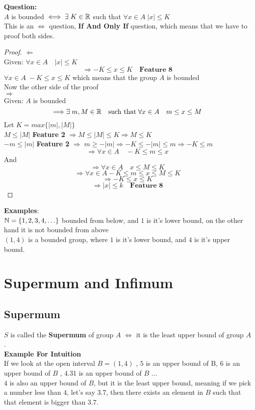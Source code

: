 \noindent \textbf{Question:}\\
$A$ is bounded $\iff \exists \; K\in \mathbb{R}$ such that $\forall x\in A \; |x|\leq K$\\
This is an $\iff$ question, \textbf{If And Only If} question, which means that we have to proof both sides.
\begin{proof}
    
    $\Longleftarrow$\\
    Given: $\forall x\in A \quad|x|\leq K$\\
    \[
        \Longrightarrow -K\leq x\leq K \quad\textbf{Feature 8}
    \]
    $\forall x\in A \; -K\leq x\leq K$ which means that the group $A$ is bounded\\
    Now the other side of the proof\\
    $\Longrightarrow$\\
    Given: $A$ is bounded\\
    \[
        \Longrightarrow \exists \; m,M \in \mathbb{R} \quad\text{such that}\; \forall x\in A \quad m\leq x\leq M
    \]
    Let $K = max\{|m|,|M|\}$\\
    $M \leq |M|$ \textbf{Feature 2} $\Longrightarrow M\leq |M|\leq K \Longrightarrow M\leq K$\\
    $-m \leq |m|$ \textbf{Feature 2} $\Longrightarrow \; m\geq -|m| \Longrightarrow -K\leq -|m| \leq m\Longrightarrow -K\leq m$\\
    \[
        \Longrightarrow \forall x\in A \quad -K\leq m\leq x
    \]
    And\\
    \[
        \Longrightarrow \forall x\in A \quad x\leq M\leq K
    \]
    \[
        \Longrightarrow \forall x\in A -K\leq m\leq x\leq M\leq K
    \]
    \[
        \Longrightarrow -K\leq x\leq K
    \]
    \[
        \Longrightarrow |x|\leq k \quad \textbf{Feature 8}
    \]
\end{proof}
\noindent \textbf{Examples}\;:\\
$\mathbb{N} = \{1,2,3,4,\ldots\}$ bounded from below, and $1$ is it's lower bound, on the other hand it is not bounded from above\\
$(1,4)$ is a bounded group, where $1$ is it's lower bound, and $4$ is it's upper bound.\\


\section{Supermum and Infimum}
\subsection{Supermum}
$S$ is called the \textbf{Supermum} of group $A$ $\iff$ it is the least upper bound of group $A$.\\
\textbf{Example For Intuition}\\
If we look at the open interval $B= (1,4)$ , $5$ is an upper bound of B, $6$ is an upper bound of $B$ , $4.31$ is an upper bound of $B$ $\ldots$\\
$4$ is also an upper bound of $B$, but it is the least upper bound, meaning if we pick a number less than $4$, let's say $3.7$, then there exists an element in $B$ such that that element is bigger than $3.7$.\\
